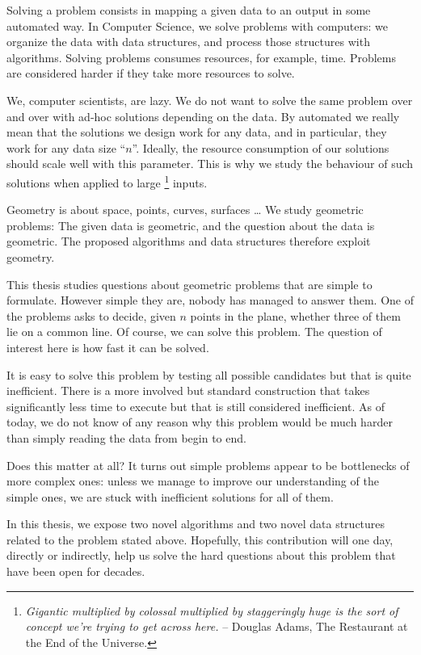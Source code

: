 

Solving a problem consists in mapping a given data to an output in some
automated way.
In Computer Science, we solve problems with computers: we organize the data
with data structures, and process those structures with algorithms.
%
Solving problems consumes resources, for example, time.
Problems are considered harder if they take more resources to solve.

We, computer scientists, are lazy. We do not want to solve the same problem
over and over with ad-hoc solutions depending on the data.
%
By automated we really mean that the solutions we
design work for any data, and in particular, they work for any data size
``\(n\)''.
%
Ideally, the resource consumption of our solutions should scale well with this
parameter.
%
This is why we study the behaviour of such solutions when applied to large%
\footnote{%
\emph{
	Gigantic multiplied by colossal multiplied by staggeringly
	huge is the sort of concept we're trying to get across here.
}-- Douglas Adams, The Restaurant at the End of the Universe.
}
inputs.

Geometry is about space, points, curves, surfaces \dots
We study geometric problems:
%
The given data is geometric, and the question about the data is geometric.
The proposed algorithms and data structures therefore exploit geometry.

This thesis studies questions about geometric problems that are simple to
formulate. However simple they are, nobody
has managed to answer them. One of the problems asks to decide, given \(n\) points in the plane,
whether three of them lie on a common line. Of course, we can solve this
problem. The question of interest here is how fast it can be solved.

It is easy to solve this problem by testing all possible candidates but that is
quite inefficient. There is a
more involved but standard construction that takes significantly less time to
execute but that is still considered inefficient. As of today, we do not know of
any reason why this problem would be much harder than simply
reading the data from begin to end.

Does this matter at all? It turns out simple problems appear to
be bottlenecks of more complex ones: unless we manage to improve our
understanding of the simple ones, we are stuck with inefficient solutions for
all of them.

In this thesis, we expose two novel algorithms and two novel data
structures related to the problem stated above. Hopefully, this contribution
will one day, directly or indirectly, help us solve the hard questions about
this problem that have been open for decades.
